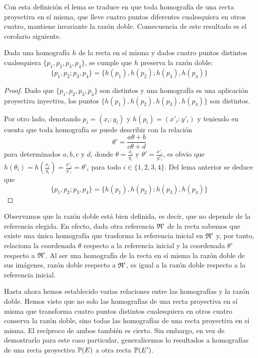 Con esta definición el lema se traduce en que toda homografía de una recta proyectiva en sí misma, que lleve cuatro puntos diferentes cualesquiera en otros cuatro, mantiene invariante la razón doble. Consecuencia de este resultado es el corolario siguiente.
\begin{cor}
	Dada una homografía $h$ de la recta en sí misma y dados cuatro puntos distintos cualesquiera $\{p_1,p_2,p_3,p_4\}$, se cumple que $h$ preserva la razón doble:
	\begin{equation}
	\{p_1,p_2;p_3,p_4\}=\{h(p_1),h(p_2);h(p_3),h(p_4)\}
	\end{equation} 
\end{cor}
\begin{proof}
	Dado que $\{p_1,p_2,p_3,p_4\}$ son distintos y una homografía es una aplicación proyectiva inyectiva, los puntos $\{h(p_1),h(p_2),h(p_3),h(p_4)\}$ son distintos.
	
	Por otro lado, denotando $p_i=(x_i:y_i)$ y $h(p_i)=(x'_i:y'_i)$ y teniendo en cuenta que toda homografía se puede describir con la relación
	\begin{equation*}
		\theta'=\frac{a\theta+b}{c\theta +d}
	\end{equation*}
	para determinados $a,b,c$ y $d$, donde $\theta=\frac{x_i}{y_i}$ y $\theta'=\frac{x'_i}{y'_i}$, es obvio que $h(\theta_i)=h(\frac{x_i}{y_i})=\frac{x'_i}{y'_i}=\theta'_i$ para todo $i\in\{1,2,3,4\}$. Del lema anterior se deduce que
	\begin{equation*}
		\{p_1,p_2;p_3,p_4\}=\{h(p_1),h(p_2);h(p_3),h(p_4)\}
	\end{equation*}
\end{proof}
\begin{obs}
	Observamos que la razón doble está bien definida, es decir, que no depende de la referencia elegida. En efecto, dada otra referencia $\mathfrak{R}'$ de la recta sabemos que existe una única homografía que trasforma la referencia inicial en $\mathfrak{R}'$ y, por tanto, relaciona la coordenada $\theta$ respecto a la referencia inicial y la coordenada $\theta'$ respecto a $\mathfrak{R}'$. Al ser una homografía de la recta en sí misma la razón doble de sus imágenes, razón doble respecto a $\mathfrak{R}'$, es igual a la razón doble respecto a la referencia inicial.
\end{obs}
Hasta ahora hemos establecido varias relaciones entre las homografías y la razón doble. Hemos visto que no solo las homografías de una recta proyectiva en sí misma que transforma cuatro puntos distintos cualesquiera en otros cuatro conserva la razón doble, sino todas las homografías de una recta proyectiva en sí misma. El recíproco de ambos también es cierto. Sin embargo, en vez de demostrarlo para este caso particular, generalicemos lo resultados a homografías de una recta proyectiva $\mathbb{P}(E)$ a otra recta $\mathbb{P}(E')$.

